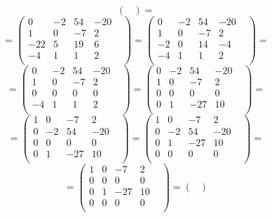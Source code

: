 \documentclass[a4paper,12pt]{article}
\begin{document}
\begin{itemize}
\begin{enumerate}
\[\begin{pmatrix}
\end{pmatrix}
=
\]
\[
=
\begin{pmatrix}
0 & -2 & 54 & -20 & \\
1 & 0 & -7 & 2 & \\
-22 & 5 & 19 & 6 & \\
-4 & 1 & 1 & 2 & \\
\end{pmatrix}
=
\begin{pmatrix}
0 & -2 & 54 & -20 & \\
1 & 0 & -7 & 2 & \\
-2 & 0 & 14 & -4 & \\
-4 & 1 & 1 & 2 & \\
\end{pmatrix}
=
\]
\[
=
\begin{pmatrix}
0 & -2 & 54 & -20 & \\
1 & 0 & -7 & 2 & \\
0 & 0 & 0 & 0 & \\
-4 & 1 & 1 & 2 & \\
\end{pmatrix}
=
\begin{pmatrix}
0 & -2 & 54 & -20 & \\
1 & 0 & -7 & 2 & \\
0 & 0 & 0 & 0 & \\
0 & 1 & -27 & 10 & \\
\end{pmatrix}
=
\]
\[
=
\begin{pmatrix}
1 & 0 & -7 & 2 & \\
0 & -2 & 54 & -20 & \\
0 & 0 & 0 & 0 & \\
0 & 1 & -27 & 10 & \\
\end{pmatrix}
=
\begin{pmatrix}
1 & 0 & -7 & 2 & \\
0 & -2 & 54 & -20 & \\
0 & 1 & -27 & 10 & \\
0 & 0 & 0 & 0 & \\
\end{pmatrix}
=
\]
\[
=
\begin{pmatrix}
1 & 0 & -7 & 2 & \\
0 & 0 & 0 & 0 & \\
0 & 1 & -27 & 10 & \\
0 & 0 & 0 & 0 & \\
\end{pmatrix}
=
\begin{pmatrix}

\end{pmatrix}\]
\end{enumerate}
\end{itemize}
\end{document}
